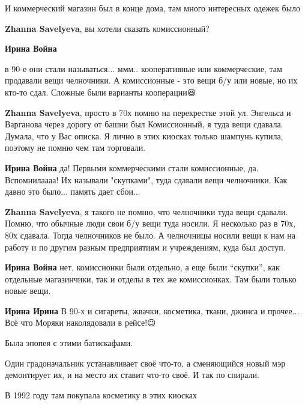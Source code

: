 
И коммерческий магазин был в конце дома, там много интересных одежек было

\begin{itemize} %
\textbf{Zhanna Savelyeva}, вы хотели сказать комиссионный?

\textbf{Ирина Война} 

в 90-е они стали называться... ммм.. кооперативные или коммерческие, там
продавали вещи челночники. А комиссионные - это вещи б/у или новые, но их
кто-то сдал. Сложные были варианты кооперации😆

\textbf{Zhanna Savelyeva}, просто в 70х помню на перекрестке этой ул. Энгельса и Варганова через дорогу от башни был Комиссионный, я туда вещи сдавала. Думала, что у Вас описка. Я лично в этих киосках только шампунь купила, поэтому не помню чем там торговали.

\textbf{Ирина Война} да! Первыми коммерческими стали комиссионные, да. Вспомнилаааа! Их называли "скупками", туда сдавали вещи челночники. Как давно это было... память дает сбои...

\textbf{Zhanna Savelyeva}, я такого не помню, что челночники туда вещи сдавали. Помню, что обычные люди свои б/у вещи туда носили. Я несколько раз в 70х, 80х сдавала. Тогда челночников не было. А челночницы носили вещи к нам на работу и по другим разным предприятиям и учреждениям, куда был доступ.

\textbf{Ирина Война} нет, комиссионки были отдельно, а еще были \enquote{скупки}, как отдельные магазинчики, так и отделы в тех же комиссионках. Там были только новые вещи.

\textbf{Ирина Ирина} В 90-х и сигареты, жвачки, косметика, ткани, джинса и прочее... Всё что Моряки наколядовали в рейсе!😉

\end{itemize} %



Была эпопея с этими батискафами.

Один градоначальник устанавливает своё что-то, а сменяющийся новый мэр
демонтирует их, и на место их ставит что-то своё. И так по спирали.


В 1992 году там покупала косметику в этих киосках


